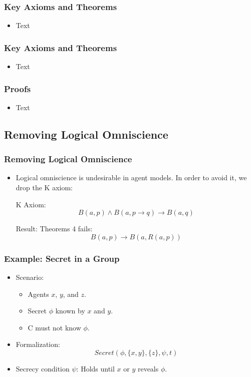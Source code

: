 \documentclass[aspectratio=169]{beamer}
\begin{document}
\begin{frame}
\frametitle{Key Axioms and Theorems} %
\begin{itemize}
    \item Text
\end{itemize}
\end{frame}

\begin{frame}
\frametitle{Key Axioms and Theorems} %
\begin{itemize}
    \item Text
\end{itemize}
\end{frame}

\begin{frame}
\frametitle{Proofs}
\begin{itemize}
    \item Text
\end{itemize}
\end{frame}

\subsection{Removing Logical Omniscience}
\begin{frame}
\frametitle{Removing Logical Omniscience}
\Large 
\begin{itemize}
    \item Logical omniscience is undesirable in agent models. In order to avoid it, we drop the K axiom:
    \begin{block}{K Axiom:}
    \[
    B(a, p) \wedge B(a, p \rightarrow q) \rightarrow B(a, q)
    \]
    \end{block}
    \begin{block}{Result:}
        Theorems 4 fails: 
        \[
        B(a, p) \rightarrow B(a, R(a, p))
        \]
    \end{block}
\end{itemize}
\end{frame}


\begin{frame}
\frametitle{Example: Secret in a Group}
\begin{itemize}
    \Large
    \item Scenario:
    \begin{itemize}
        \Large
        \item Agents $x$, $y$, and $z$.
        \item Secret $\phi$ known by $x$ and $y$.
        \item C must not know $\phi$.
    \end{itemize}
    \item Formalization:
    \[
    Secret(\phi, \{x,y\}, \{z\}, \psi, t)
    \]
    \item Secrecy condition $\psi$: Holds until $x$ or $y$ reveals $\phi$.
\end{itemize}
\end{frame}
\end{document}
